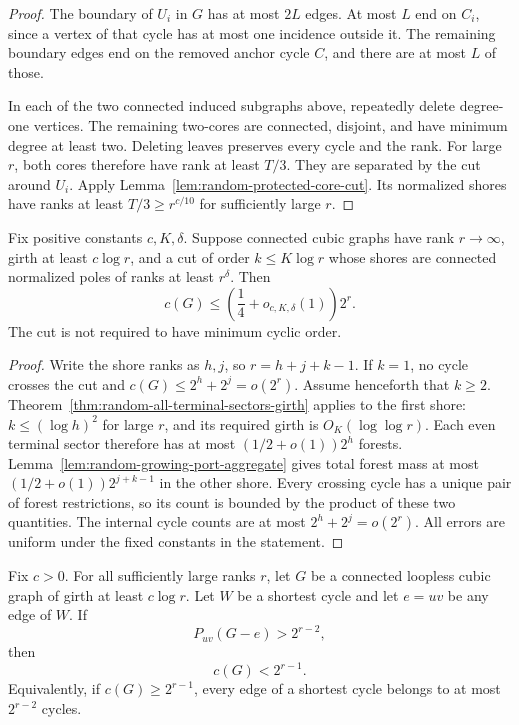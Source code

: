 \begin{proof}
The boundary of $U_i$ in $G$ has at most $2L$ edges.
At most $L$ end on $C_i$, since a vertex of that cycle has at most one incidence outside it.
The remaining boundary edges end on the removed anchor cycle $C$, and there are at most $L$ of those.

In each of the two connected induced subgraphs above, repeatedly delete degree-one vertices.
The remaining two-cores are connected, disjoint, and have minimum degree at least two.
Deleting leaves preserves every cycle and the rank.
For large $r$, both cores therefore have rank at least $T/3$.
They are separated by the cut around $U_i$.
Apply Lemma~\ref{lem:random-protected-core-cut}.
Its normalized shores have ranks at least $T/3\ge r^{c/10}$ for sufficiently large $r$.
\end{proof}

\begin{lemma}
\label{lem:random-general-large-shore-quarter}
Fix positive constants $c,K,\delta$.
Suppose connected cubic graphs have rank $r\to\infty$, girth at least $c\log r$, and a cut of order $k\le K\log r$ whose shores are connected normalized poles of ranks at least $r^\delta$.
Then
\[
 c(G)\le\left(\frac14+o_{c,K,\delta}(1)\right)2^r.
\]
The cut is not required to have minimum cyclic order.
\end{lemma}

\begin{proof}
Write the shore ranks as $h,j$, so $r=h+j+k-1$.
If $k=1$, no cycle crosses the cut and $c(G)\le2^h+2^j=o(2^r)$.
Assume henceforth that $k\ge2$.
Theorem~\ref{thm:random-all-terminal-sectors-girth} applies to the first shore:
$k\le(\log h)^2$ for large $r$, and its required girth is $O_K(\log\log r)$.
Each even terminal sector therefore has at most $(1/2+o(1))2^h$ forests.
Lemma~\ref{lem:random-growing-port-aggregate} gives total forest mass at most
$(1/2+o(1))2^{j+k-1}$ in the other shore.
Every crossing cycle has a unique pair of forest restrictions, so its count is bounded by the product of these two quantities.
The internal cycle counts are at most $2^h+2^j=o(2^r)$.
All errors are uniform under the fixed constants in the statement.
\end{proof}

\begin{theorem}
\label{thm:random-high-girth-edge-dichotomy}
Fix $c>0$.
For all sufficiently large ranks $r$, let $G$ be a connected loopless cubic graph of girth at least $c\log r$.
Let $W$ be a shortest cycle and let $e=uv$ be any edge of $W$.
If
\[
 P_{uv}(G-e)>2^{r-2},
\]
then
\[
 c(G)<2^{r-1}.
\]
Equivalently, if $c(G)\ge2^{r-1}$, every edge of a shortest cycle belongs to at most $2^{r-2}$ cycles.
\end{theorem}

